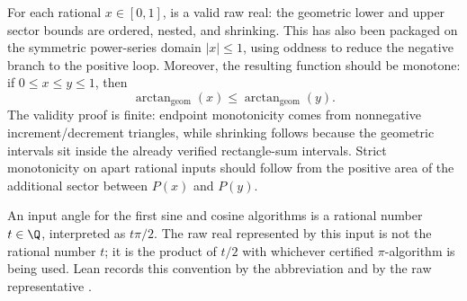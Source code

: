 \begin{theorem}
\label{thm:arctan-area-valid-monotone}
For each rational \(x\in[0,1]\),  is a valid raw real:
the geometric lower and upper sector bounds are ordered, nested, and shrinking.
This has also been packaged on the symmetric power-series domain \(|x|\le1\),
using oddness to reduce the negative branch to the positive loop.
Moreover, the resulting function should be monotone: if
\(0\le x\le y\le1\), then
\[
  \arctan_{\mathrm{geom}}(x)\le \arctan_{\mathrm{geom}}(y).
\]
The validity proof is finite: endpoint monotonicity comes from nonnegative
increment/decrement triangles, while shrinking follows because the geometric
intervals sit inside the already verified rectangle-sum intervals.  Strict
monotonicity on apart rational inputs should follow from the positive area of
the additional sector between \(P(x)\) and \(P(y)\).
\end{theorem}

\begin{definition}
\label{def:quarter-turn-angle}
An input angle for the first sine and cosine algorithms is a rational number
\(t\in\Q\), interpreted as \(t\pi/2\).  The raw real represented by this input is
not the rational number \(t\); it is the product of \(t/2\) with whichever
certified \(\pi\)-algorithm is being used.  Lean records this convention by the
abbreviation  and by the raw representative
.
\end{definition}

